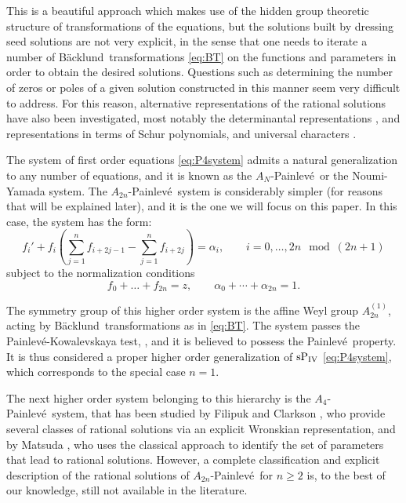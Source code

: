 \documentclass[10pt]{amsart}
\theoremstyle{definition}
\numberwithin{equation}{section}
\numberwithin{figure}{section}
\newcommand{\Pfour}{{\rm P_{IV}}}
\newcommand{\p}{Painlev\'{e}}
\newcommand{\bk}{B\"acklund}
\renewcommand{\a}{\alpha}
\begin{document}
This is a beautiful approach which makes use of the hidden group theoretic structure of transformations of the equations,
but the solutions built by dressing seed solutions are not very explicit,
in the sense that one needs to iterate a number of \bk\ transformations \eqref{eq:BT} on the functions and parameters in order to obtain the desired solutions. Questions such as determining the number of zeros or poles of a given solution constructed in this manner seem very difficult to address. For this reason, alternative representations of the rational solutions have also been investigated, most notably the determinantal representations \cite{kajiwara1996determinant,kajiwara1998determinant}, and representations in terms of Schur polynomials,\cite{noumi1999symmetries} and universal characters \cite{tsuda2005universal}.

The system of first order equations \eqref{eq:P4system} admits a
natural generalization to any number of equations, and it is known as
the $A_{N}$-\p\ or the Noumi-Yamada system. The $A_{2n}$-\p\ system  is considerably simpler (for reasons that will be
explained later), and it is the one we will focus on this paper. In
this case, the system has the form:
\begin{equation}\label{eq:Ansystem}
  f_i'+f_i \left( \sum_{j=1}^n f_{i+2j-1} - \sum_{j=1}^n f_{i+2j}
  \right)=\a_i,\qquad i=0,\dots,2n \mod (2n+1)
\end{equation}
subject to the normalization conditions
\begin{equation}
  \label{eq:alpha1}
f_0+\dots+f_{2n}= z,\qquad \a_0+\cdots + \a_{2n}=1.
\end{equation}

The symmetry group of this higher order system is the affine Weyl group $A_{2n}^{(1)}$, acting by \bk\ transformations as in \eqref{eq:BT}. The system passes the  Painlev\'e-Kowalevskaya test, \cite{veselov1993dressing}, and it is believed to possess the \p\ property.  It is thus considered a proper higher order generalization of $\rm{s}\Pfour$ \eqref{eq:P4system}, which corresponds to the special case $n=1$.

The next higher order system belonging to this hierarchy is the $A_4$-\p\ system, that has been studied by Filipuk and Clarkson  \cite{filipuk2008symmetric}, who provide several classes of rational solutions via an explicit Wronskian representation, and by Matsuda \cite{matsuda2012rational}, who uses the classical approach to identify the set of parameters that lead to rational solutions. However, a complete classification and explicit description of the rational solutions of $A_{2n}$-\p\ for $n\geq2$ is, to the best of our knowledge, still not available in the literature.
\end{document}
